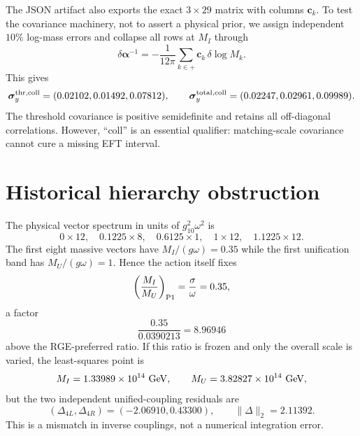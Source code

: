 \documentclass[11pt]{article}
\begin{document}
The JSON artifact also exports the exact $3\times29$ matrix with columns
$\bm c_k$.  To test the covariance machinery, not to assert a physical
prior, we assign independent $10\%$ log-mass errors and collapse all rows at
$M_I$ through
\begin{equation}
 \delta\bm\alpha^{-1}=-\frac1{12\pi}
 \sum_{k\in+}\bm c_k\,\delta\log M_k.
 \label{eq:collapsedprojection}
\end{equation}
This gives
\begin{equation}
 \bm\sigma_y^{\rm thr,coll}=(0.02102,0.01492,0.07812),\qquad
 \bm\sigma_y^{\rm total,coll}=(0.02247,0.02961,0.09989).
 \label{eq:thresholdsigma}
\end{equation}
The threshold covariance is positive semidefinite and retains all
off-diagonal correlations.  However, ``coll'' is an essential qualifier:
matching-scale covariance cannot cure a missing EFT interval.

\section{Historical hierarchy obstruction}\label{sec:hierarchy}

The physical vector spectrum in units of $g_{10}^2\omega^2$ is
\begin{equation}
 0\times12,\quad0.1225\times8,\quad0.6125\times1,\quad
 1\times12,\quad1.1225\times12.
 \label{eq:vectors}
\end{equation}
The first eight massive vectors have $M_I/(g\omega)=0.35$ while the first
unification band has $M_U/(g\omega)=1$.  Hence the action itself fixes
\begin{equation}
 \left(\frac{M_I}{M_U}\right)_{\rm P1}=\frac\sigma\omega=0.35,
 \end{equation}
a factor
\begin{equation}
 \frac{0.35}{0.0390213}=8.96946
 \label{eq:ratiomismatch}
\end{equation}
above the RGE-preferred ratio.  If this ratio is frozen and only the overall
scale is varied, the least-squares point is
\begin{equation}
 M_I=1.33989\times10^{14}\ {\rm GeV},\qquad
 M_U=3.82827\times10^{14}\ {\rm GeV},
\end{equation}
but the two independent unified-coupling residuals are
\begin{equation}
 (\Delta_{4L},\Delta_{4R})=(-2.06910,0.43300),\qquad
 \|\Delta\|_2=2.11392.
 \label{eq:fixedresidual}
\end{equation}
This is a mismatch in inverse couplings, not a numerical integration error.
\end{document}
